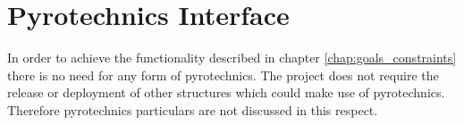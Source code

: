 \chapter{Pyrotechnics Interface}
\label{chap:pyro}
%
%
In order to achieve the functionality described in chapter \ref{chap:goals_constraints} there is no need for any form of pyrotechnics. The project does not require the release or deployment of other structures which could make use of pyrotechnics. Therefore pyrotechnics particulars are not discussed in this respect.
%